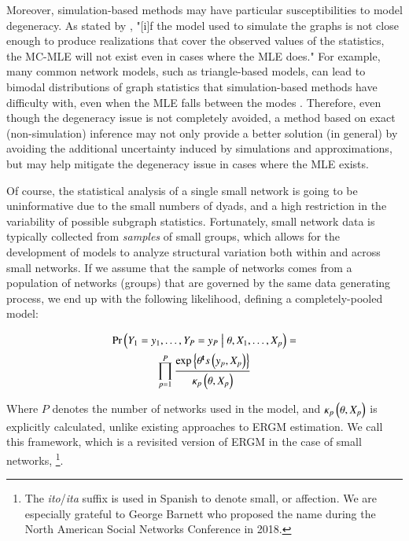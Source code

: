\documentclass[review]{elsarticle}
\begin{document}
Moreover, simulation-based methods may have particular susceptibilities to model degeneracy. As stated by \cite[p. 7]{Handcock2003}, "[i]f the model used to simulate the graphs is not close enough to produce realizations that cover the observed values of the statistics, the MC-MLE will not exist even in cases where the MLE does." For example, many common network models, such as triangle-based models, can lead to bimodal distributions of graph statistics that simulation-based methods have difficulty with, even when the MLE falls between the modes \cite{Hunteretal2012}. Therefore, even though the degeneracy issue is not completely avoided, a method based on exact (non-simulation) inference may not only provide a better solution (in general) by avoiding the additional uncertainty induced by simulations and approximations, but may help mitigate the degeneracy issue in cases where the MLE exists.

Of course, the statistical analysis of a single small network is going to be uninformative due to the small numbers of dyads, and a high restriction in the variability of possible subgraph statistics. Fortunately, small network data is typically collected from \textit{samples} of small groups, which allows for the development of models to analyze structural variation both within and across small networks. If we assume that the sample of networks comes from a population of networks (groups) that are governed by the same data generating process, we end up with the following likelihood, defining a completely-pooled model:

\begin{multline}
    \label{eq:ergm-pooled}
    \Prcond{\Adjmat_1 = \adjmat_1, \dots, \Adjmat_P = \adjmat_P}{\params, \Indepvar_1, \dots, \Indepvar_p} = \\
    \prod_{p=1}^P\frac{%
    		\exp{\transpose{\params}\sufstats{\adjmat_p, \Indepvar_p}}%
    	}{
    		\kappa_p\left(\params, \Indepvar_p\right)
    	}
\end{multline}

\noindent Where $P$ denotes the number of networks used in the model, and $\kappa_p\left(\theta, X_p\right)$ is explicitly calculated, unlike existing approaches to ERGM estimation. We call this framework, which is a revisited version of ERGM in the case of small networks, \ergmito{}\footnote{The \textit{ito}/\textit{ita} suffix is used in Spanish to denote small, or affection. We are especially grateful to George Barnett who proposed the name during the North American Social Networks Conference in 2018.}.
\end{document}
